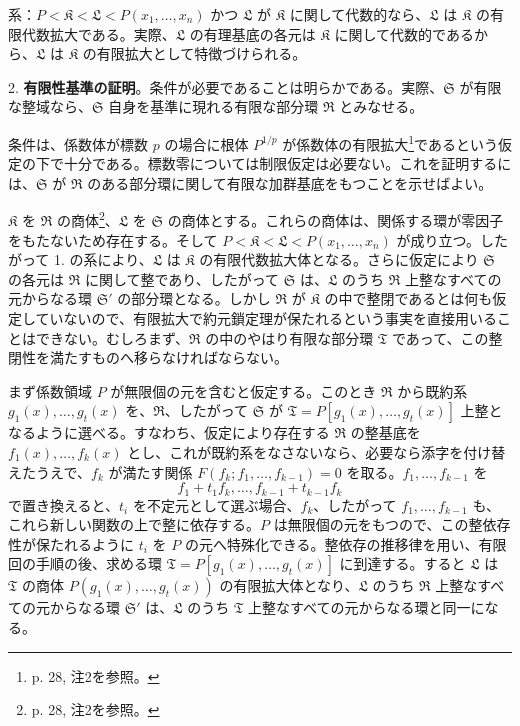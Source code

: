 \documentclass[11pt]{article}
\begin{document}
系：$P<\mathfrak K<\mathfrak L<P(x_1,\ldots,x_n)$ かつ $\mathfrak L$ が $\mathfrak K$ に関して代数的なら、$\mathfrak L$ は $\mathfrak K$ の有限代数拡大である。実際、$\mathfrak L$ の有理基底の各元は $\mathfrak K$ に関して代数的であるから、$\mathfrak L$ は $\mathfrak K$ の有限拡大として特徴づけられる。

2. \textbf{有限性基準の証明}。条件が必要であることは明らかである。実際、$\mathfrak S$ が有限な整域なら、$\mathfrak S$ 自身を基準に現れる有限な部分環 $\mathfrak R$ とみなせる。

条件は、係数体が標数 $p$ の場合に根体 $P^{1/p}$ が係数体の有限拡大\footnote{p. 28, 注2を参照。}であるという仮定の下で十分である。標数零については制限仮定は必要ない。これを証明するには、$\mathfrak S$ が $\mathfrak R$ のある部分環に関して有限な加群基底をもつことを示せばよい。

$\mathfrak K$ を $\mathfrak R$ の商体\footnote{p. 28, 注2を参照。}、$\mathfrak L$ を $\mathfrak S$ の商体とする。これらの商体は、関係する環が零因子をもたないため存在する。そして $P<\mathfrak K<\mathfrak L<P(x_1,\ldots,x_n)$ が成り立つ。したがって 1. の系により、$\mathfrak L$ は $\mathfrak K$ の有限代数拡大体となる。さらに仮定により $\mathfrak S$ の各元は $\mathfrak R$ に関して整であり、したがって $\mathfrak S$ は、$\mathfrak L$ のうち $\mathfrak R$ 上整なすべての元からなる環 $\mathfrak S'$ の部分環となる。しかし $\mathfrak R$ が $\mathfrak K$ の中で整閉であるとは何も仮定していないので、有限拡大で約元鎖定理が保たれるという事実を直接用いることはできない。むしろまず、$\mathfrak R$ の中のやはり有限な部分環 $\mathfrak T$ であって、この整閉性を満たすものへ移らなければならない。

まず係数領域 $P$ が無限個の元を含むと仮定する。このとき $\mathfrak R$ から既約系 $g_1(x),\ldots,g_t(x)$ を、$\mathfrak R$、したがって $\mathfrak S$ が $\mathfrak T=P[g_1(x),\ldots,g_t(x)]$ 上整となるように選べる。すなわち、仮定により存在する $\mathfrak R$ の整基底を $f_1(x),\ldots,f_k(x)$ とし、これが既約系をなさないなら、必要なら添字を付け替えたうえで、$f_k$ が満たす関係 $F(f_k;f_1,\ldots,f_{k-1})=0$ を取る。$f_1,\ldots,f_{k-1}$ を
\[
 f_1+t_1f_k,\ldots,f_{k-1}+t_{k-1}f_k
\]
で置き換えると、$t_i$ を不定元として選ぶ場合、$f_k$、したがって $f_1,\ldots,f_{k-1}$ も、これら新しい関数の上で整に依存する。$P$ は無限個の元をもつので、この整依存性が保たれるように $t_i$ を $P$ の元へ特殊化できる。整依存の推移律を用い、有限回の手順の後、求める環 $\mathfrak T=P[g_1(x),\ldots,g_t(x)]$ に到達する。すると $\mathfrak L$ は $\mathfrak T$ の商体 $P(g_1(x),\ldots,g_t(x))$ の有限拡大体となり、$\mathfrak L$ のうち $\mathfrak R$ 上整なすべての元からなる環 $\mathfrak S'$ は、$\mathfrak L$ のうち $\mathfrak T$ 上整なすべての元からなる環と同一になる。
\end{document}
